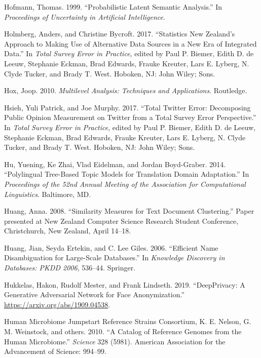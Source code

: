 \documentclass[]{krantz}
\begin{document}
\hypertarget{ref-hofmann-99}{}
Hofmann, Thomas. 1999. ``Probabilistic Latent Semantic Analysis.'' In
\emph{Proceedings of Uncertainty in Artificial Intelligence}.

\hypertarget{ref-Holmberg2017}{}
Holmberg, Anders, and Christine Bycroft. 2017. ``Statistics New
Zealand's Approach to Making Use of Alternative Data Sources in a New
Era of Integrated Data.'' In \emph{Total Survey Error in Practice},
edited by Paul P. Biemer, Edith D. de Leeuw, Stephanie Eckman, Brad
Edwards, Frauke Kreuter, Lars E. Lyberg, N. Clyde Tucker, and Brady T.
West. Hoboken, NJ: John Wiley; Sons.

\hypertarget{ref-hox2010multilevel}{}
Hox, Joop. 2010. \emph{Multilevel Analysis: Techniques and
Applications}. Routledge.

\hypertarget{ref-Hsieh2017}{}
Hsieh, Yuli Patrick, and Joe Murphy. 2017. ``Total Twitter Error:
Decomposing Public Opinion Measurement on Twitter from a Total Survey
Error Perspective.'' In \emph{Total Survey Error in Practice}, edited by
Paul P. Biemer, Edith D. de Leeuw, Stephanie Eckman, Brad Edwards,
Frauke Kreuter, Lars E. Lyberg, N. Clyde Tucker, and Brady T. West.
Hoboken, NJ: John Wiley; Sons.

\hypertarget{ref-Hu:Zhai:Eidelman:Boyd-Graber-2014}{}
Hu, Yuening, Ke Zhai, Vlad Eidelman, and Jordan Boyd-Graber. 2014.
``Polylingual Tree-Based Topic Models for Translation Domain
Adaptation.'' In \emph{Proceedings of the 52nd Annual Meeting of the
Association for Computational Linguistics}. Baltimore, MD.

\hypertarget{ref-huang-08}{}
Huang, Anna. 2008. ``Similarity Measures for Text Document Clustering.''
Paper presented at New Zealand Computer Science Research Student
Conference, Christchurch, New Zealand, April 14--18.

\hypertarget{ref-HEG06}{}
Huang, Jian, Seyda Ertekin, and C. Lee Giles. 2006. ``Efficient Name
Disambiguation for Large-Scale Databases.'' In \emph{Knowledge Discovery
in Databases: PKDD 2006}, 536--44. Springer.

\hypertarget{ref-Hukkelas2019}{}
Hukkelas, Hakon, Rudolf Mester, and Frank Lindseth. 2019. ``DeepPrivacy:
A Generative Adversarial Network for Face Anonymization.''
\url{https://arxiv.org/abs/1909.04538}.

\hypertarget{ref-human2010catalog}{}
Human Microbiome Jumpstart Reference Strains Consortium, K. E. Nelson,
G. M. Weinstock, and others. 2010. ``A Catalog of Reference Genomes from
the Human Microbiome.'' \emph{Science} 328 (5981). American Association
for the Advancement of Science: 994--99.
\end{document}
